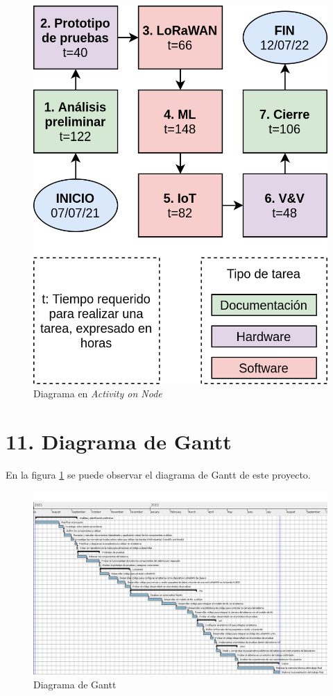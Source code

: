 \documentclass[
11pt, %
]{plan}
\begin{document}
\begin{figure}[htpb]
\centering
\includegraphics[width=.6\textwidth]{./fig/AoN.png}
\caption{Diagrama en \textit{Activity on Node}}
\label{fig:AoN}
\end{figure}

\section{11. Diagrama de Gantt}
\label{sec:gantt}

En la figura \ref{sec:gantt} se puede observar el diagrama de Gantt de este proyecto.

\begin{landscape}
\begin{figure}[htpb]
\centering
\includegraphics[height=.95\textheight]{./fig/gantt.png}
\caption{Diagrama de Gantt}
\label{fig:diagGantt}
\end{figure}

\end{landscape}
\end{document}
